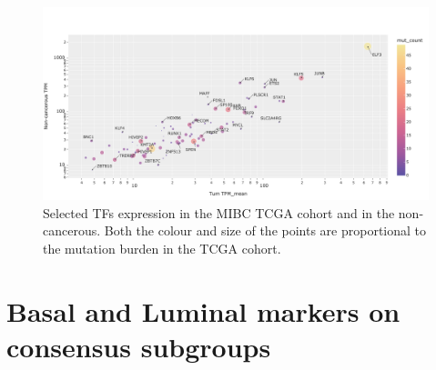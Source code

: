 \begin{figure}[!htb]
    \centering
    \includegraphics[width=1.0\textwidth,keepaspectratio]{Sections/Network_I/Resources/selective_pruning/sel_tfs/sel_tfs_mean_tum_healthy.png}
    \caption[Tumour vs non-tumour gene expression of the 98 TFs]{Selected TFs expression in the MIBC TCGA cohort and in the non-cancerous. Both the colour and size of the points are proportional to the mutation burden in the TCGA cohort.}
    \label{fig:ap:sel_tfs_mean}
\end{figure}


\section{Basal and Luminal markers on consensus subgroups} \label{s:ap:sel_prun_markers}

